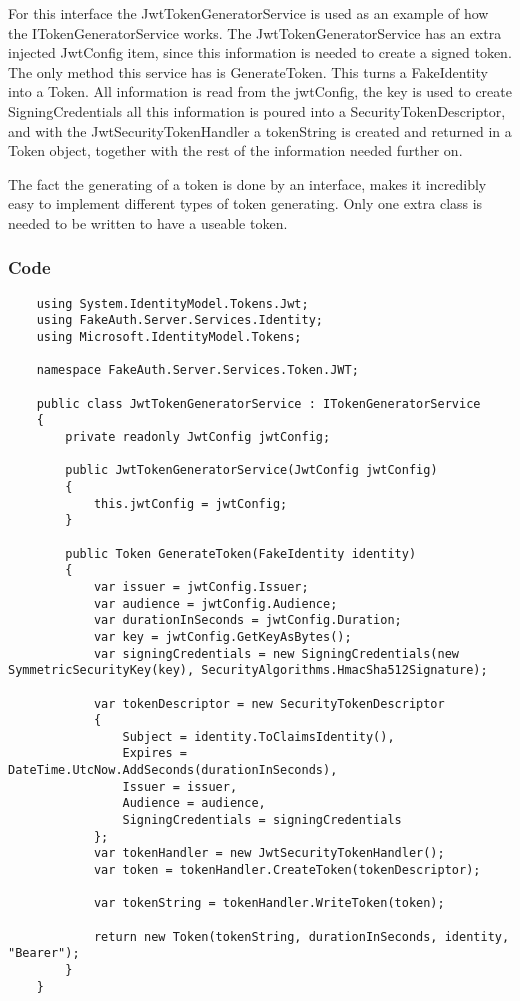 For this interface the JwtTokenGeneratorService is used as an example of how the ITokenGeneratorService works. The JwtTokenGeneratorService has an extra injected JwtConfig item, since this information is needed to create a signed token. The only method this service has is GenerateToken. This turns a FakeIdentity into a Token. All information is read from the jwtConfig, the key is used to create SigningCredentials all this information is poured into a SecurityTokenDescriptor, and with the JwtSecurityTokenHandler a tokenString is created and returned in a Token object, together with the rest of the information needed further on.

The fact the generating of a token is done by an interface, makes it incredibly easy to implement different types of token generating. Only one extra class is needed to be written to have a useable token. 

\subsubsection{Code}

\begin{verbatim}
    using System.IdentityModel.Tokens.Jwt;
    using FakeAuth.Server.Services.Identity;
    using Microsoft.IdentityModel.Tokens;
    
    namespace FakeAuth.Server.Services.Token.JWT;
    
    public class JwtTokenGeneratorService : ITokenGeneratorService
    {
        private readonly JwtConfig jwtConfig;
        
        public JwtTokenGeneratorService(JwtConfig jwtConfig)
        {
            this.jwtConfig = jwtConfig;
        }
        
        public Token GenerateToken(FakeIdentity identity)
        {
            var issuer = jwtConfig.Issuer;
            var audience = jwtConfig.Audience;
            var durationInSeconds = jwtConfig.Duration;
            var key = jwtConfig.GetKeyAsBytes();
            var signingCredentials = new SigningCredentials(new SymmetricSecurityKey(key), SecurityAlgorithms.HmacSha512Signature);
            
            var tokenDescriptor = new SecurityTokenDescriptor
            {
                Subject = identity.ToClaimsIdentity(),
                Expires = DateTime.UtcNow.AddSeconds(durationInSeconds),
                Issuer = issuer,
                Audience = audience,
                SigningCredentials = signingCredentials
            };
            var tokenHandler = new JwtSecurityTokenHandler();
            var token = tokenHandler.CreateToken(tokenDescriptor);
            
            var tokenString = tokenHandler.WriteToken(token);
            
            return new Token(tokenString, durationInSeconds, identity, "Bearer");
        }
    }
\end{verbatim}

